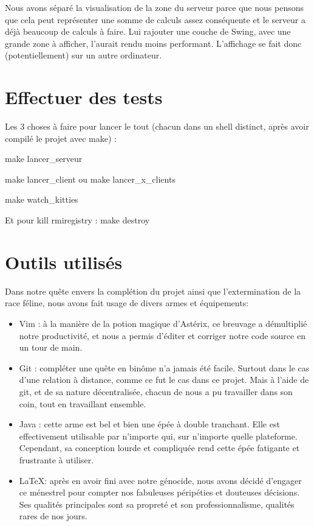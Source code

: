 \documentclass[twoside]{article}
\begin{document}
Nous avons séparé la visualisation de la zone du serveur parce que nous pensons que cela peut représenter une somme de calculs assez conséquente et le serveur a déjà beaucoup de calculs à faire. 
Lui rajouter une couche de Swing, avec une grande zone à afficher, l'aurait rendu moins performant.
L'affichage se fait donc (potentiellement) sur un autre ordinateur.

\section{Effectuer des tests}
Les 3 choses à faire pour lancer le tout (chacun dans un shell distinct, après avoir compilé le projet avec make) :
\begin{description}
	\item make lancer\_serveur
	\item make lancer\_client ou make lancer\_x\_clients
	\item make watch\_kitties
\end{description}
Et pour kill rmiregistry :
	make destroy

\section{Outils utilisés}
Dans notre quête envers la complétion du projet ainsi que l'extermination de la race féline, nous avons fait usage de divers armes et équipements:
\begin{itemize}
    \item Vim : à la manière de la potion magique d'Astérix, ce breuvage a démultiplié notre productivité, et nous a permis d'éditer et corriger notre code source en un tour de main.
    \item Git : compléter une quête en binôme n'a jamais été facile. 
	Surtout dans le cas d'une relation à distance, comme ce fut le cas dans ce projet. 
	Mais à l'aide de git, et de sa nature décentralisée, chacun de nous a pu travailler dans son coin, tout en travaillant ensemble.
    \item Java : cette arme est bel et bien une épée à double tranchant. 
	Elle est effectivement utilisable par n'importe qui, sur n'importe quelle plateforme. 
	Cependant, sa conception lourde et compliquée rend cette épée fatigante et frustrante à utiliser.
    \item \LaTeX : après en avoir fini avec notre génocide, nous avons décidé d'engager ce ménestrel pour compter nos fabuleuses péripéties et douteuses décisions.
        Ses qualités principales sont sa propreté et son professionnalisme, qualités rares de nos jours.
\end{itemize}
\end{document}
